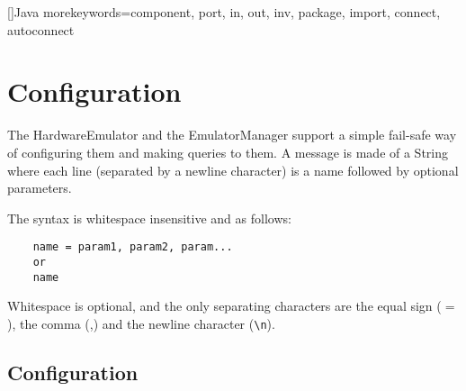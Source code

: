 []{Java}{
  morekeywords={component, port, in, out, inv, package, import, connect, autoconnect}
}

\setlength{\voffset}{-1in}
\setlength{\hoffset}{-1in}

\setlength{\topmargin}{2.5cm}		   
\setlength{\headheight}{0cm}		   
\setlength{\headsep}{0cm}		   
\setlength{\oddsidemargin}{3,3cm}  %
\setlength{\evensidemargin}{2,7cm} %
\setlength{\textwidth}{15cm}		   
\setlength{\textheight}{23,5cm}		   
\setlength{\parindent}{0cm}

\newcommand{\emptyLine}{{\LARGE ~\\}}


\setcounter{page}{1}


\section{Configuration}
\label{emuconfig}

The HardwareEmulator and the EmulatorManager support a simple fail-safe way of configuring them and making queries to them. A message is made of a String where each line (separated by a newline character) is a name followed by optional parameters.

The syntax is whitespace insensitive and as follows:
\begin{verbatim}
    name = param1, param2, param...
    or
    name
\end{verbatim}
Whitespace is optional, and the only separating characters are the equal sign ($=$), the comma (,) and the newline character (\texttt{\textbackslash n}).

\subsection{Configuration}

